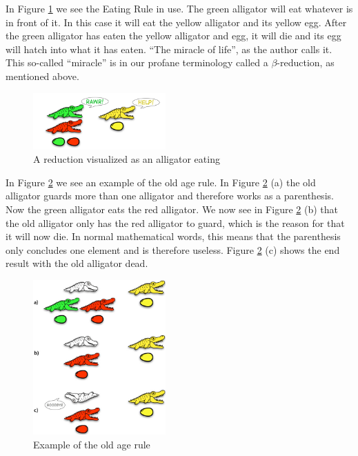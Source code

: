 In Figure \ref{fig:images_alligatorEat} we see the Eating Rule in use. The
green alligator will eat whatever is in front of it. In this case it will eat
the yellow alligator and its yellow egg. After the green alligator has eaten
the yellow alligator and egg, it will die and its egg will hatch into what it
has eaten. ``The miracle of life'', as the author calls it. This so-called
``miracle'' is in our profane terminology called a $\beta$-reduction, as
mentioned above.

\begin{figure}[htbp]
	\centering
		\includegraphics[width=2in]{../images/alligatorEat.png}
	\caption{A reduction visualized as an alligator eating}
	\label{fig:images_alligatorEat}
\end{figure}

In Figure \ref{fig:images_alligatorOld} we see an example of the old age rule.
In Figure \ref{fig:images_alligatorOld} (a) the old alligator guards more than
one alligator and therefore works as a parenthesis. Now the green alligator
eats the red alligator. We now see in Figure \ref{fig:images_alligatorOld} (b)
that the old alligator only has the red alligator to guard, which is the
reason for that it will now die. In normal mathematical words, this means that
the parenthesis only concludes one element and is therefore useless. Figure
\ref{fig:images_alligatorOld} (c) shows the end result with the old alligator
dead.

\begin{figure}[htbp]
	\centering
		\includegraphics[width=2in]{../images/alligatorOld.jpg}
	\caption{Example of the old age rule}
	\label{fig:images_alligatorOld}
\end{figure}

